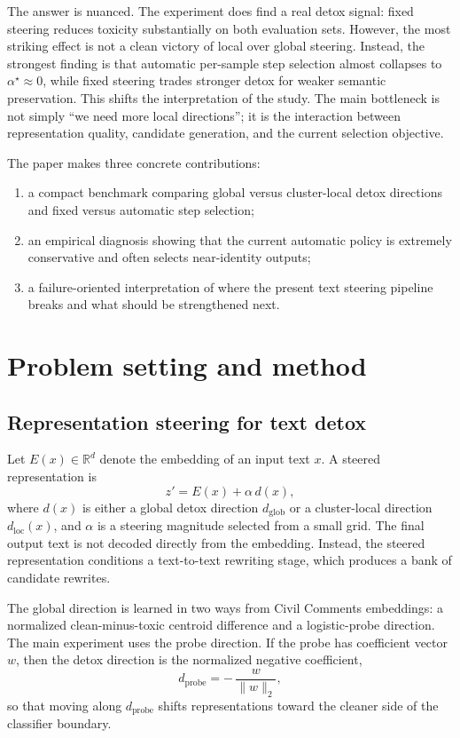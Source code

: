 \documentclass[10pt,twocolumn]{article}
\begin{document}
The answer is nuanced. The experiment does find a real detox signal: fixed steering reduces toxicity substantially on both evaluation sets. However, the most striking effect is not a clean victory of local over global steering. Instead, the strongest finding is that automatic per-sample step selection almost collapses to $\alpha^\star \approx 0$, while fixed steering trades stronger detox for weaker semantic preservation. This shifts the interpretation of the study. The main bottleneck is not simply \enquote{we need more local directions}; it is the interaction between representation quality, candidate generation, and the current selection objective.

The paper makes three concrete contributions:
\begin{enumerate}[leftmargin=1.2em,itemsep=0.15em]
\item a compact benchmark comparing global versus cluster-local detox directions and fixed versus automatic step selection;
\item an empirical diagnosis showing that the current automatic policy is extremely conservative and often selects near-identity outputs;
\item a failure-oriented interpretation of where the present text steering pipeline breaks and what should be strengthened next.
\end{enumerate}

\section{Problem setting and method}
\subsection{Representation steering for text detox}
Let $E(x)\in\mathbb{R}^d$ denote the embedding of an input text $x$. A steered representation is
\begin{equation}
z' = E(x) + \alpha\, d(x),
\end{equation}
where $d(x)$ is either a global detox direction $d_{\mathrm{glob}}$ or a cluster-local direction $d_{\mathrm{loc}}(x)$, and $\alpha$ is a steering magnitude selected from a small grid. The final output text is not decoded directly from the embedding. Instead, the steered representation conditions a text-to-text rewriting stage, which produces a bank of candidate rewrites.

The global direction is learned in two ways from Civil Comments embeddings: a normalized clean-minus-toxic centroid difference and a logistic-probe direction. The main experiment uses the probe direction. If the probe has coefficient vector $w$, then the detox direction is the normalized negative coefficient,
\begin{equation}
d_{\mathrm{probe}} = -\, \frac{w}{\|w\|_2},
\end{equation}
so that moving along $d_{\mathrm{probe}}$ shifts representations toward the cleaner side of the classifier boundary.
\end{document}
